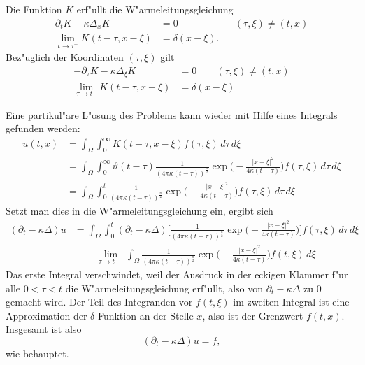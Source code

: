 \begin{satz}
Die Funktion $K$ erf"ullt die W"armeleitungsgleichung
\begin{align*}
\partial_tK-\kappa\Delta_xK&=0&&(\tau, \xi)\ne(t,x)
\\
\lim_{t\to\tau^+}K(t-\tau, x-\xi)&=\delta(x-\xi).
\end{align*}
Bez"uglich der Koordinaten $(\tau,\xi)$ gilt
\begin{align*}
-\partial_{\tau} K-\kappa\Delta_{\xi}K&=0\qquad(\tau,\xi)\ne(t,x)
\\
\lim_{\tau\to t^-}K(t-\tau, x-\xi)&=\delta(x-\xi)
\end{align*}
\end{satz}

Eine partikul"are L"osung des Problems kann wieder mit Hilfe eines Integrals
gefunden werden:
\begin{align*}
u(t,x)
&=
\int_\Omega\int_0^\infty
K(t-\tau,x-\xi)f(\tau,\xi)
\,d\tau\,d\xi
\\
&=
\int_\Omega\int_0^\infty
\vartheta(t-\tau)\frac1{(4\pi\kappa(t-\tau))^{\frac{n}2}}
\exp\biggl(-\frac{|x-\xi|^2}{4\kappa(t-\tau)}\biggr)
f(\tau,\xi)
\,d\tau\,d\xi
\\
&=
\int_\Omega\int_0^t
\frac1{(4\pi\kappa(t-\tau))^{\frac{n}2}}
\exp\biggl(-\frac{|x-\xi|^2}{4\kappa(t-\tau)}\biggr)
f(\tau,\xi)
\,d\tau\,d\xi
\end{align*}
Setzt man dies in die W"armeleitungsgleichung ein, ergibt sich
\begin{align*}
(\partial_t-\kappa\Delta)u
&=
\int_\Omega\int_0^t
(\partial_t-\kappa\Delta)\biggl[
\frac1{(4\pi\kappa(t-\tau))^{\frac{n}2}}
\exp\biggl(-\frac{|x-\xi|^2}{4\kappa(t-\tau)}\biggr)\biggr]
f(\tau,\xi)
\,d\tau\,d\xi
\\
&\quad+
\lim_{\tau\to t-}
\int_\Omega
\frac1{(4\pi\kappa(t-\tau))^{\frac{n}2}}
\exp\biggl(-\frac{|x-\xi|^2}{4\kappa(t-\tau)}\biggr)
f(t,\xi)
\,d\xi
\end{align*}
Das erste Integral verschwindet, weil der Ausdruck in der eckigen Klammer
f"ur alle $0<\tau<t$ die W"armeleitungsgleichung erf"ullt, also von
$\partial_t-\kappa\Delta$ zu $0$ gemacht wird.
Der Teil des Integranden vor $f(t,\xi)$ im zweiten Integral ist eine
Approximation der $\delta$-Funktion an der Stelle $x$, also ist der Grenzwert
$f(t,x)$. Insgesamt ist also
$$(\partial_t-\kappa\Delta)u=f,$$
wie behauptet.

